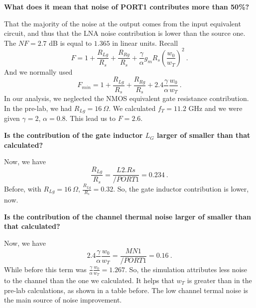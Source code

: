 \begin{pexbox}{}
   \noindent \textbf{What does it mean that noise of PORT1 contributes more than 50\%?}
\end{pexbox}

   \noindent That the majority of the noise at the output comes from the input equivalent circuit, and thus that the LNA noise contribution is lower than the source one. The $NF=2.7$ dB is equal to $1.365$ in linear units. Recall
   \begin{equation}
      F = 1 + \frac{R_{Lg}}{R_s} + \frac{R_{Rg}}{R_s} + \frac{\gamma}{\alpha} g_m R_s \left(\frac{w_0}{w_T}\right)^2 \ .
   \end{equation}
   \noindent And we normally used
   \begin{equation}
      F_{min} = 1 + \frac{R_{Lg}}{R_s} + \frac{R_{Rg}}{R_s} + 2.4 \frac{\gamma}{\alpha} \frac{w_0}{w_T} \ .
   \end{equation}
   \noindent In our analysis, we neglected the NMOS equivalent gate resistance contribution. In the pre-lab, we had $R_{Lg} = 16 \ \Omega$. We calculated $f_T = 11.2$ GHz and we were given $\gamma = 2$, $\alpha = 0.8$. This lead us to $F = 2.6$. 

\begin{pexbox}{}
   \noindent \textbf{Is the contribution of the gate inductor $L_G$ larger of smaller than that calculated?}
\end{pexbox}

   \noindent Now, we have
   \begin{equation}
      \frac{R_{Lg}}{R_s} = \frac{L2.Rs}{/PORT1} = 0.234 \ .
   \end{equation}
   \noindent Before, with $R_{Lg} = 16 \ \Omega$, $\frac{R_{Lg}}{R_s} = 0.32$. So, the gate inductor contribution is lower, now.



\begin{pexbox}{}
   \noindent \textbf{Is the contribution of the channel thermal noise larger of smaller than that calculated?}
\end{pexbox}

   \noindent Now, we have
   \begin{equation}
       2.4 \frac{\gamma}{\alpha} \frac{w_0}{w_T} = \frac{MN1}{/PORT1} = 0.16 \ .
   \end{equation}
   \noindent While before this term was $\frac{\gamma}{\alpha} \frac{w_0}{w_T} = 1.267$. So, the simulation attributes less noise to the channel than the one we calculated. It helps that $w_T$ is greater than in the pre-lab calculations, as shown in a table before. The low channel termal noise is the main source of noise improvement.


